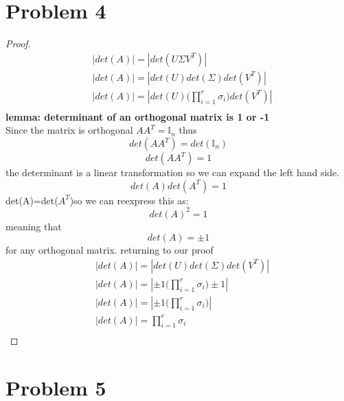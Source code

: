 \documentclass[12pt]{article}
\newcommand{\sect}[1]{\section*{#1}}
\begin{document}
\sect{Problem 4}
\begin{proof}
\begin{align*}
  &|det(A)|=|det(U\Sigma V^T)|\\
  &|det(A)|=|det(U)det(\Sigma)det(V^T)|\\
  &|det(A)|=|det(U)\Big(\prod_{i=1}^r\sigma_i\Big)det(V^T)|\\
\end{align*}
\textbf{lemma: determinant of an orthogonal matrix is 1 or -1}\\
Since the matrix is orthogonal $AA^T=\mathbb{I}_n$ thus \\
\[
  det(AA^T)=det(\mathbb{I}_n)
\]
\[
  det(AA^T)=1
\]the determinant is a linear transformation so we can expand the left hand side.
\[
    det(A)det(A^T)=1
\]
det(A)=det($A^T$)so we can reexpress this as:
\[
    det(A)^2=1
\]
meaning that \[
    det(A)=\pm1
\]
for any orthogonal matrix.
returning to our proof
\begin{align*}
  &|det(A)|=|det(U)det(\Sigma)det(V^T)|\\
  &|det(A)|=|\pm1\Big(\prod_{i=1}^r\sigma_i\Big)\pm1|\\
  &|det(A)|=|\pm1\Big(\prod_{i=1}^r\sigma_i\Big)|\\
  &|det(A)|=\prod_{i=1}^r\sigma_i\\
\end{align*}
\blacksquare
\end{proof}
\sect{Problem 5}
\end{document}
